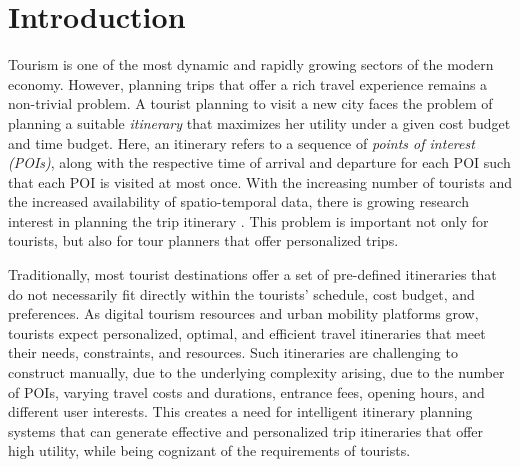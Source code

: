 \section{Introduction}

Tourism is one of the most dynamic and rapidly growing sectors of the modern
economy. However, planning trips that offer a rich travel experience remains a
non-trivial problem. A tourist planning to visit a new city faces the problem of
planning a suitable \emph{itinerary} that maximizes her utility under a given
cost budget and time budget. Here, an itinerary refers to a sequence of
\emph{points of interest (POIs)}, along with the respective time of arrival and
departure for each POI such that each POI is visited at most once. With the
increasing number of tourists and the increased availability of spatio-temporal
data, there is growing research interest in planning the trip itinerary
\cite{li2016travel, gavalas2014survey, sylejmani2011survey}. This problem is
important not only for tourists, but also for tour planners that offer
personalized trips.

Traditionally, most tourist destinations offer a set of pre-defined itineraries
that do not necessarily fit directly within the tourists' schedule, cost budget,
and preferences. As digital tourism resources and urban mobility platforms grow,
tourists expect personalized, optimal, and efficient travel itineraries that
meet their needs, constraints, and resources. Such itineraries are challenging
to construct manually, due to the underlying complexity arising, due to the number
of POIs, varying travel costs and durations, entrance fees, opening hours, and
different user interests. This creates a need for intelligent
itinerary planning systems that can generate effective and personalized trip
itineraries that offer high utility, while being cognizant of the requirements
of tourists.

